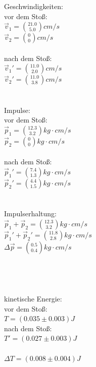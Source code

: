 \documentclass[12pt,a4paper]{article}
\begin{document}
\begin{multicols}{2}
Geschwindigkeiten:\\
vor dem Stoß:\\
$\vec v_1 =\binom{21.0}{5.0} cm/s$\\
$\vec v_2 =\binom{0}{0} cm/s$\\
\\
nach dem Stoß:\\
$\vec v_1' =\binom{11.0}{2.0} cm/s$\\
$\vec v_2 '=\binom{11.0}{3.8} cm/s$\\
\\
\\
Impulse:\\
vor dem Stoß:\\
$\vec p_1 =\binom{12.3}{3.2} kg\cdot cm/s$\\
$\vec p_2 =\binom{0}{0} kg\cdot cm/s$\\
\\
nach dem Stoß:\\
$\vec p_1' =\binom{7.4}{1.3} kg\cdot cm/s$\\
$\vec p_2 '=\binom{4.4}{1.5} kg\cdot cm/s$\\
\\
\\
Impulserhaltung:\\
$\vec p_1 + \vec p_2 = \binom{12.3}{3.2} kg\cdot cm/s$\\
$\vec p_1' + \vec p_2' = \binom{11.8}{2.8} kg\cdot cm/s$\\
$\Delta \vec p =  \binom{0.5}{0.4} kg\cdot cm/s$\\
\\
\\
\\
\\
kinetische Energie:\\
vor dem Stoß:\\
$T = (0.035 \pm 0.003) J$\\
nach dem Stoß:\\
$T'=(0.027 \pm 0.003) J$\\
\\
$\Delta T= (0.008 \pm 0.004) J$
\\
\\



\end{multicols}
\end{document}
